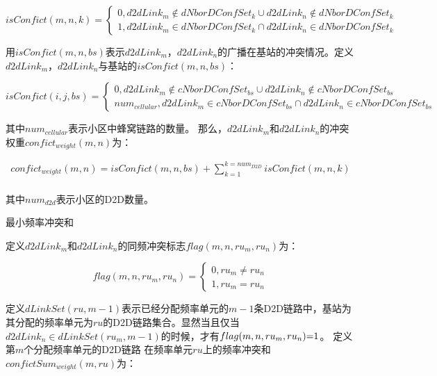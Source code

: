 \documentclass[figurelist,tablelist,algorithmlist,nomlist,masters]{seuthesix}
\begin{document}
\begin{enumerate}
	\begin{equation}\label{eq2.1}
	isConfict(m,n,k) = \left\{ \begin{array}{l}
	0,d2dLin{k_m} \notin dNborDConfSe{t_k} \cup d2dLin{k_n} \notin dNborDConfSe{t_k}\\
	1,d2dLin{k_m} \in dNborDConfSe{t_k} \cap d2dLin{k_n} \in dNborDConfSe{t_k}
	\end{array} \right.
	\end{equation}
	
	用$isConfict(m,n,bs)$表示$d2dLin{k_m}$，$d2dLin{k_n}$的广播在基站的冲突情况。定义$d2dLin{k_m}$，$d2dLin{k_n}$与基站的$isConfict(m,n,bs)$：
	
	\begin{equation}\label{eq2.1}
	isConfict(i,j,bs) = \left\{ \begin{array}{l} 0,d2dLin{k_m} \notin cNborDConfSe{t_{bs}} \cup d2dLin{k_n} \notin cNborDConfSe{t_{bs}}\\nu{m_{cellular}},d2dLin{k_m} \in cNborDConfSe{t_{bs}} \cap d2dLin{k_n} \in cNborDConfSe{t_{bs}} \end{array} \right.
	\end{equation}
	
	其中$nu{m_{cellular}}$表示小区中蜂窝链路的数量。
	那么，$d2dLin{k_m}$和$d2dLin{k_n}$的冲突权重$confic{t_{weight}}(m,n)$为：
	
	\begin{equation}\label{eq2.1}
	\begin{array}{l}
	confic{t_{weight}}(m,n) = isConfict(m,n,bs) + \sum\limits_{k = 1}^{k = nu{m_{D2D}}} {isConfict(m,n,k)} \\\end{array}
	\end{equation}
	
	
	其中$nu{m_{d2d}}$表示小区的D2D数量。
	
	最小频率冲突和
	
	定义$d2dLin{k_m}$和$d2dLin{k_n}$的同频冲突标志$flag(m,n,r{u_m},r{u_n})$为：
	
	\begin{equation}\label{eq2.1}
	flag(m,n,r{u_m},r{u_n}) = \left\{ \begin{array}{l} 0,r{u_m} \ne r{u_n}\\1,r{u_m} = r{u_n}\end{array} \right.
	\end{equation}
	
	定义$dLinkSet(ru,m - 1)$表示已经分配频率单元的$m-1$条D2D链路中，基站为其分配的频率单元为$ru$的D2D链路集合。显然当且仅当$d2dLin{k_n} \in dLinkSet(r{u_m},m - 1)$的时候，才有$flag(m,n,r{u_m},r{u_n}){\rm{ = }}1$。
	定义第$m$个分配频率单元的D2D链路 在频率单元$ru$上的频率冲突和$confictSu{m_{weight}}(m,ru)$为：
	

\end{enumerate}
\end{document}
